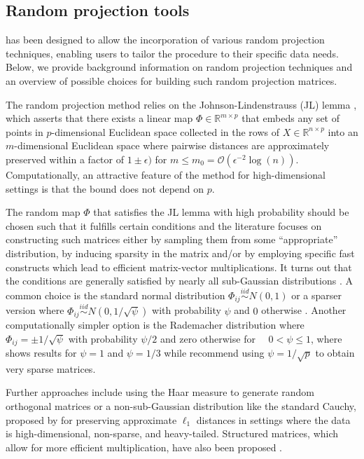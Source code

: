 \documentclass[
  article]{jss}
\begin{document}
\subsection{Random projection tools}\label{sec-rps}

 has been designed to allow the incorporation of various
random projection techniques, enabling users to tailor the procedure to
their specific data needs. Below, we provide background information on
random projection techniques and an overview of possible choices for
building such random projection matrices.

The random projection method relies on the Johnson-Lindenstrauss (JL)
lemma \citep{JohnsonLindenstrauss1984}, which asserts that there exists
a linear map \(\Phi\in \mathbb{R}^{m \times p}\) that embeds any set of
points in \(p\)-dimensional Euclidean space collected in the rows of
\(X\in \mathbb{R}^{n\times p}\) into an \(m\)-dimensional Euclidean
space where pairwise distances are approximately preserved within a
factor of \(1\pm\epsilon)\) for
\(m\leq m_0=\mathcal O(\epsilon^{-2}\log(n))\). Computationally, an
attractive feature of the method for high-dimensional settings is that
the bound does not depend on \(p\).

The random map \(\Phi\) that satisfies the JL lemma with high
probability should be chosen such that it fulfills certain conditions
\citep[see][]{JohnsonLindenstrauss1984} and the literature focuses on
constructing such matrices either by sampling them from some
``appropriate'' distribution, by inducing sparsity in the matrix and/or
by employing specific fast constructs which lead to efficient
matrix-vector multiplications. It turns out that the conditions are
generally satisfied by nearly all sub-Gaussian distributions
\citep{matouvsek2008variants}. A common choice is the standard normal
distribution \(\Phi_{ij} \overset{iid}{\sim} N(0,1)\)
\citep{FRANKL1988JLSphere} or a sparser version where
\(\Phi_{ij}\overset{iid}{\sim} N(0,1/\sqrt{\psi})\) with probability
\(\psi\) and \(0\) otherwise \citep{matouvsek2008variants}. Another
computationally simpler option is the Rademacher distribution where
\(\Phi_{ij} =  \pm 1/\sqrt{\psi}\) with probability \(\psi/2\) and zero
otherwise for \(\quad 0<\psi\leq 1\), where \citet{ACHLIOPTAS2003JL}
shows results for \(\psi=1\) and \(\psi=1/3\) while
\citet{LiHastie2006VerySparseRP} recommend using \(\psi=1/\sqrt{p}\) to
obtain very sparse matrices.

Further approaches include using the Haar measure to generate random
orthogonal matrices \citep{cannings2017random} or a non-sub-Gaussian
distribution like the standard Cauchy, proposed by
\citet{LiHastie2006VerySparseRP} for preserving approximate \(\ell_1\)
distances in settings where the data is high-dimensional, non-sparse,
and heavy-tailed. Structured matrices, which allow for more efficient
multiplication, have also been proposed \citep[see
e.g.,][]{ailon2009fast, Clarkson2013LowRankApprox}.
\end{document}
